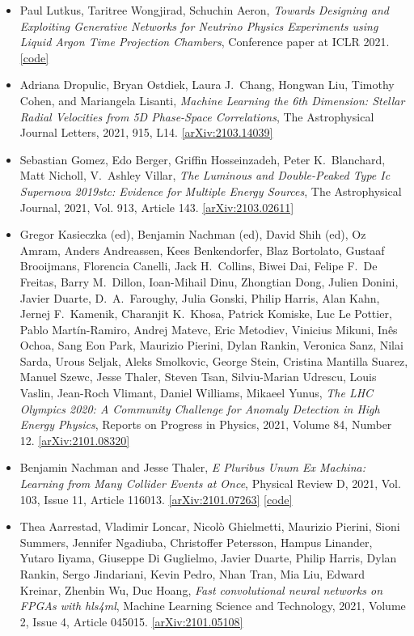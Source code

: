 \begin{itemize}
\item Paul Lutkus, Taritree Wongjirad, Schuchin Aeron, \textit{Towards Designing and Exploiting Generative Networks for Neutrino Physics Experiments using Liquid Argon Time Projection Chambers}, Conference paper at ICLR 2021.  \href{https://github.com/NuTufts/LArTPC-VQVAE}{[code]} 
\item Adriana Dropulic, Bryan Ostdiek, Laura J.\  Chang, Hongwan Liu, Timothy Cohen, and Mariangela Lisanti, \textit{Machine Learning the 6th Dimension: Stellar Radial Velocities from 5D Phase-Space Correlations}, The Astrophysical Journal Letters, 2021, 915, L14. \href{https://arxiv.org/abs/2103.14039}{[arXiv:2103.14039]} 
\item Sebastian Gomez, Edo Berger, Griffin Hosseinzadeh, Peter K.\  Blanchard, Matt Nicholl, V.\  Ashley Villar, \textit{The Luminous and Double-Peaked Type Ic Supernova 2019stc: Evidence for Multiple Energy Sources}, The Astrophysical Journal, 2021, Vol. 913, Article 143. \href{https://arxiv.org/abs/2103.02611}{[arXiv:2103.02611]} 
\item Gregor Kasieczka (ed), Benjamin Nachman (ed), David Shih (ed), Oz Amram, Anders Andreassen, Kees Benkendorfer, Blaz Bortolato, Gustaaf Brooijmans, Florencia Canelli, Jack H.\  Collins, Biwei Dai, Felipe F.\  De Freitas, Barry M.\  Dillon, Ioan-Mihail Dinu, Zhongtian Dong, Julien Donini, Javier Duarte, D.\  A.\  Faroughy, Julia Gonski, Philip Harris, Alan Kahn, Jernej F.\  Kamenik, Charanjit K.\  Khosa, Patrick Komiske, Luc Le Pottier, Pablo Martín-Ramiro, Andrej Matevc, Eric Metodiev, Vinicius Mikuni, Inês Ochoa, Sang Eon Park, Maurizio Pierini, Dylan Rankin, Veronica Sanz, Nilai Sarda, Urous Seljak, Aleks Smolkovic, George Stein, Cristina Mantilla Suarez, Manuel Szewc, Jesse Thaler, Steven Tsan, Silviu-Marian Udrescu, Louis Vaslin, Jean-Roch Vlimant, Daniel Williams, Mikaeel Yunus, \textit{The LHC Olympics 2020: A Community Challenge for Anomaly Detection in High Energy Physics}, Reports on Progress in Physics, 2021, Volume 84, Number 12. \href{https://arxiv.org/abs/2101.08320}{[arXiv:2101.08320]} 
\item Benjamin Nachman and Jesse Thaler, \textit{E Pluribus Unum Ex Machina: Learning from Many Collider Events at Once}, Physical Review D, 2021, Vol. 103, Issue 11, Article 116013. \href{https://arxiv.org/abs/2101.07263}{[arXiv:2101.07263]}  \href{https://github.com/bnachman/EnsembleLearning}{[code]} 
\item Thea Aarrestad, Vladimir Loncar, Nicolò Ghielmetti, Maurizio Pierini, Sioni Summers, Jennifer Ngadiuba, Christoffer Petersson, Hampus Linander, Yutaro Iiyama, Giuseppe Di Guglielmo, Javier Duarte, Philip Harris, Dylan Rankin, Sergo Jindariani, Kevin Pedro, Nhan Tran, Mia Liu, Edward Kreinar, Zhenbin Wu, Duc Hoang, \textit{Fast convolutional neural networks on FPGAs with hls4ml}, Machine Learning Science and Technology, 2021, Volume 2, Issue 4, Article 045015. \href{https://arxiv.org/abs/2101.05108}{[arXiv:2101.05108]} 

\end{itemize}
